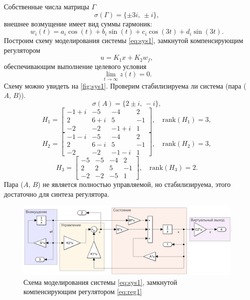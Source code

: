 Собственные числа матрицы $\Gamma$
\begin{equation}
    \label{eq:specG}
    \sigma(\Gamma)=\{\pm3i,\ \pm i\},
\end{equation}
внешнее возмущение имеет вид суммы гармоник:
\begin{equation*}
    w_i(t)=a_i\cos(t)+b_i\sin(t) + c_i\cos(3t)+d_i\sin(3t).
\end{equation*}
Построим схему моделирования системы \eqref{eq:sys1},
замкнутой компенсирующим регулятором
\begin{equation}
    u=K_1x+K_2w_f,
    \label{eq:reg1}
\end{equation}
обеспечивающим выполнение целевого условия
\begin{equation*}
    \lim_{t\rightarrow\infty}z(t)=0.
\end{equation*}
Схему можно увидеть на \autoref{fig:sys1}.
Проверим стабилизируема ли система (пара ($A$, $B$)).
\begin{equation*}
    \sigma(A)=\{2\pm i,\ -i\},
\end{equation*}
\begin{equation*}
    H_1=\begin{bmatrix}
        -1 + i & -5 & -4 & 2 \\
        2 & 6 + i & 5 & -1 \\
        -2 & -2 & -1 + i & 1
    \end{bmatrix},\quad \text{rank}(H_1)=3,
\end{equation*}
\begin{equation*}
    H_2=\begin{bmatrix}
        -1 - i & -5 & -4 & 2 \\
        2 & 6 - i & 5 & -1 \\
        -2 & -2 & -1 - i & 1
    \end{bmatrix},\quad \text{rank}(H_2)=3,
\end{equation*}
\begin{equation*}
    H_3=\begin{bmatrix}
        -5 & -5 & -4 & 2 \\
        2 & 2 & 5 & -1 \\
        -2 & -2 & -5 & 1
    \end{bmatrix},\quad \text{rank}(H_3)=2.
\end{equation*}
Пара ($A$, $B$) не является полностью управляемой, но
стабилизируема, этого достаточно для синтеза регулятора.

\begin{figure}[H]
    \centering
    \includegraphics[width=\linewidth]{figs/task1_slx.png}
    \caption{Схема моделирования системы \eqref{eq:sys1},
    замкнутой компенсирующим регулятором \eqref{eq:reg1}}
    \label{fig:sys1}
\end{figure}

